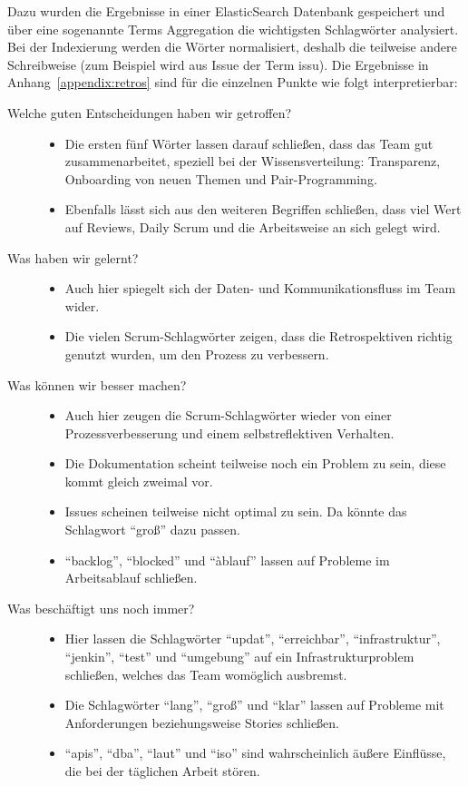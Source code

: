 Dazu wurden die Ergebnisse in einer ElasticSearch Datenbank gespeichert und über eine sogenannte Terms Aggregation die wichtigsten Schlagwörter analysiert.
Bei der Indexierung werden die Wörter normalisiert, deshalb die teilweise andere Schreibweise (zum Beispiel wird aus Issue der Term issu).
Die Ergebnisse in Anhang~\ref{appendix:retros} sind für die einzelnen Punkte wie folgt interpretierbar:

\begin{description}
    \item[Welche guten Entscheidungen haben wir getroffen?] \hfill
    \begin{itemize}[noitemsep]
      \item Die ersten fünf Wörter lassen darauf schließen, dass das Team gut zusammenarbeitet, speziell bei der Wissensverteilung: Transparenz, Onboarding von neuen Themen und Pair-Programming.
      \item Ebenfalls lässt sich aus den weiteren Begriffen schließen, dass viel Wert auf Reviews, Daily Scrum und die Arbeitsweise an sich gelegt wird.
    \end{itemize}
    \item[Was haben wir gelernt?] \hfill
    \begin{itemize}[noitemsep]
      \item Auch hier spiegelt sich der Daten- und Kommunikationsfluss im Team wider.
      \item Die vielen Scrum-Schlagwörter zeigen, dass die Retrospektiven richtig genutzt wurden, um den Prozess zu verbessern.
    \end{itemize}
    \item[Was können wir besser machen?] \hfill
    \begin{itemize}[noitemsep]
      \item Auch hier zeugen die Scrum-Schlagwörter wieder von einer Prozessverbesserung und einem selbstreflektiven Verhalten.
      \item Die Dokumentation scheint teilweise noch ein Problem zu sein, diese kommt gleich zweimal vor.
      \item Issues scheinen teilweise nicht optimal zu sein. Da könnte das Schlagwort ``groß'' dazu passen.
      \item ``backlog'', ``blocked'' und ``àblauf'' lassen auf Probleme im Arbeitsablauf schließen.
    \end{itemize}
    \item[Was beschäftigt uns noch immer?] \hfill
    \begin{itemize}[noitemsep]
      \item Hier lassen die Schlagwörter ``updat'', ``erreichbar'', ``infrastruktur'', ``jenkin'', ``test'' und ``umgebung'' auf ein Infrastrukturproblem schließen, welches das Team womöglich ausbremst.
      \item Die Schlagwörter ``lang'', ``groß'' und ``klar'' lassen auf Probleme mit Anforderungen beziehungsweise Stories schließen.
      \item ``apis'', ``dba'', ``laut'' und ``iso'' sind wahrscheinlich äußere Einflüsse, die bei der täglichen Arbeit stören.
    \end{itemize}
  \end{description}

